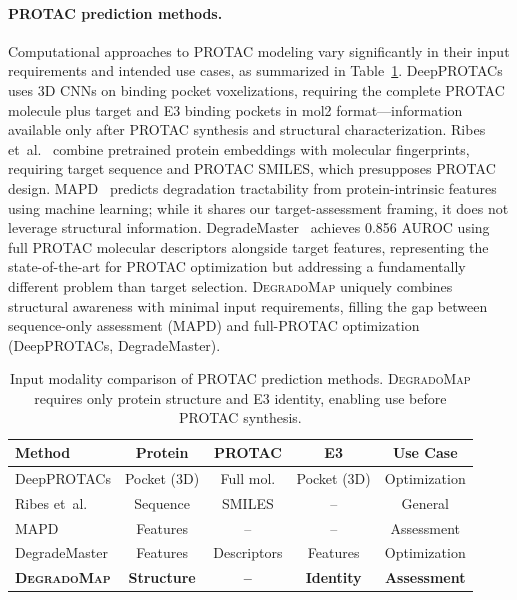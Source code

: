 \documentclass[sigconf]{acmart}
\newcommand{\ours}{\textsc{DegradoMap}}
\begin{document}
\paragraph{PROTAC prediction methods.}
Computational approaches to PROTAC modeling vary significantly in their input requirements and intended use cases, as summarized in Table~\ref{tab:positioning}.
DeepPROTACs~\cite{li2022deepprotacs} uses 3D CNNs on binding pocket voxelizations, requiring the complete PROTAC molecule plus target and E3 binding pockets in mol2 format---information available only after PROTAC synthesis and structural characterization.
Ribes et~al.~\cite{ribes2024protac} combine pretrained protein embeddings with molecular fingerprints, requiring target sequence and PROTAC SMILES, which presupposes PROTAC design.
MAPD~\cite{zhang2022mapd} predicts degradation tractability from protein-intrinsic features using machine learning; while it shares our target-assessment framing, it does not leverage structural information.
DegradeMaster~\cite{liu2025degrademaster} achieves 0.856 AUROC using full PROTAC molecular descriptors alongside target features, representing the state-of-the-art for PROTAC optimization but addressing a fundamentally different problem than target selection.
\ours{} uniquely combines structural awareness with minimal input requirements, filling the gap between sequence-only assessment (MAPD) and full-PROTAC optimization (DeepPROTACs, DegradeMaster).

\begin{table}[!ht]
\centering
\caption{Input modality comparison of PROTAC prediction methods. \ours{} requires only protein structure and E3 identity, enabling use before PROTAC synthesis.}
\label{tab:positioning}
\footnotesize
\setlength{\tabcolsep}{3pt}
\begin{tabular}{@{}lcccc@{}}
\toprule
\textbf{Method} & \textbf{Protein} & \textbf{PROTAC} & \textbf{E3} & \textbf{Use Case} \\
\midrule
DeepPROTACs & Pocket (3D) & Full mol. & Pocket (3D) & Optimization \\
Ribes et~al. & Sequence & SMILES & -- & General \\
MAPD & Features & -- & -- & Assessment \\
DegradeMaster & Features & Descriptors & Features & Optimization \\
\textbf{\ours{}} & \textbf{Structure} & \textbf{--} & \textbf{Identity} & \textbf{Assessment} \\
\bottomrule
\end{tabular}
\end{table}
\end{document}
